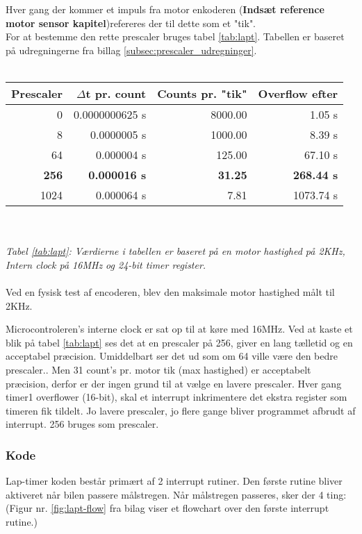 Hver gang der kommer et impuls fra motor enkoderen (\textbf{Indsæt reference motor sensor kapitel})refereres der til dette som et "tik".\\
For at bestemme den rette prescaler bruges tabel \ref{tab:lapt}. Tabellen er baseret på udregningerne fra billag \ref{subsec:prescaler_udregninger}.\\
\\
\begin{tabular}{ | r | r | r | r | }
	\hline
	Prescaler 		& $\Delta$t pr. count 	& Counts pr. "tik"	&	Overflow efter		\\
	\hline
	0 				& 	 	0.0000000625 s	&  		8000.00		&		1.05 s			\\
	\hline

	8 				& 	 	0.0000005 s		&  		1000.00		&		8.39 s			\\
	\hline
	64 				& 	 	0.000004 s		&  		125.00		&		67.10 s			\\
	\hline
	\textbf{256} 	& \textbf{0.000016 s}	&  	\textbf{31.25}	&	\textbf{268.44 s}	\\
	\hline
	1024 			& 	 	0.000064 s		&  		7.81		&		1073.74 s		\\
	\hline
\end{tabular}
\label{tab:lapt}
\\
\\
\textsl{\small Tabel \ref{tab:lapt}: Værdierne i tabellen er baseret på en motor hastighed på 2KHz, Intern clock på 16MHz og 24-bit timer register.}\\
\\
Ved en fysisk test af encoderen, blev den maksimale motor hastighed målt til 2KHz.

Microcontroleren's interne clock er sat op til at køre med 16MHz. Ved at kaste et blik på tabel \ref{tab:lapt} ses det at en prescaler på 256, giver en lang tælletid og en acceptabel præcision. Umiddelbart ser det ud som om 64 ville være den bedre prescaler..
Men 31 count's pr. motor tik (max hastighed) er acceptabelt præcision, derfor er der ingen grund til at vælge en lavere prescaler. Hver gang timer1 overflower (16-bit), skal et interrupt inkrimentere det ekstra register som timeren fik tildelt. Jo lavere prescaler, jo flere gange bliver programmet afbrudt af interrupt. 256 bruges som prescaler.

\subsubsection{Kode}
Lap-timer koden består primært af 2 interrupt rutiner. Den første rutine bliver aktiveret når bilen passere målstregen. Når målstregen passeres, sker der 4 ting: (Figur nr. \ref{fig:lapt-flow} fra bilag viser et flowchart over den første interrupt rutine.)

